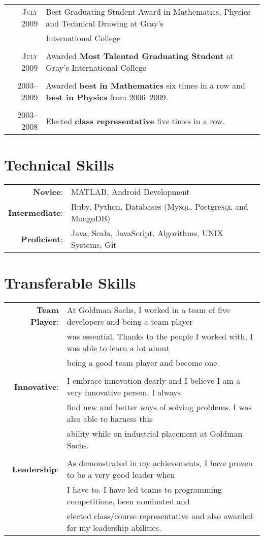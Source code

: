 \documentclass[a4paper,10pt]{article}
\begin{document}
\begin{tabular}{rl}
  \textsc{July} 2009 & Best Graduating Student Award in Mathematics, Physics and Technical Drawing
  at Gray’s\\& International College\\\\

  \textsc{July} 2009 & Awarded \textbf{Most Talented Graduating Student} at Gray’s International
  College\\\\

  \textsc{2003--2009} & Awarded \textbf{best in Mathematics} six times in a row and \textbf{best in
  Physics} from 2006--2009.\\\\

  \textsc{2003--2008} & Elected \textbf{class representative} five times in a row.
\end{tabular}

\section{Technical Skills}
\begin{tabular}{rl}
  \textbf{Novice}:       & MATLAB, Android Development\\
  \textbf{Intermediate}: & Ruby, Python, Databases (My\textsc{sql}, Postgre\textsc{sql} and MongoDB)\\
  \textbf{Proficient}:   & Java, Scala, JavaScript, Algorithms, UNIX Systems, Git
\end{tabular}

\section{Transferable Skills}
\begin{tabular}{rl}
  \textbf{Team Player}: & At Goldman Sachs, I worked in a team of five developers and being a team
  player\\& was essential. Thanks to the people I worked with, I was able to learn a lot about\\&
  being a good team player and become one.\\\\

  \textbf{Innovative}: & I embrace innovation dearly and I believe I am a very innovative person. I
  always\\& find new and better ways of solving problems. I was also able to harness this\\& ability
  while on industrial placement at Goldman Sachs. \\\\

  \textbf{Leadership}: & As demonstrated in my achievements, I have proven to be a very good leader
  when\\& I have to. I have led teams to programming competitions, been nominated and\\& elected
  class/course representative and also awarded for my leadership abilities.
\end{tabular}
\end{document}
